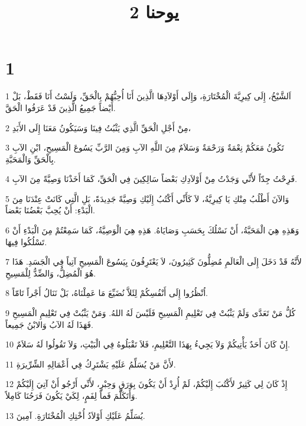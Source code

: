 

\title{2 يوحنا}


\chapter{1}

\par 1 اَلشَّيْخُ، إِلَى كِيرِيَّةَ الْمُخْتَارَةِ، وَإِلَى أَوْلاَدِهَا الَّذِينَ أَنَا أُحِبُّهُمْ بِالْحَقِّ، وَلَسْتُ أَنَا فَقَطْ، بَلْ أَيْضاً جَمِيعُ الَّذِينَ قَدْ عَرَفُوا الْحَقَّ.
\par 2 مِنْ أَجْلِ الْحَقِّ الَّذِي يَثْبُتُ فِينَا وَسَيَكُونُ مَعَنَا إِلَى الأَبَدِ،
\par 3 تَكُونُ مَعَكُمْ نِعْمَةٌ وَرَحْمَةٌ وَسَلاَمٌ مِنَ اللَّهِ الآبِ وَمِنَ الرَّبِّ يَسُوعَ الْمَسِيحِ، ابْنِ الآبِ بِالْحَقِّ وَالْمَحَبَّةِ.
\par 4 فَرِحْتُ جِدّاً لأَنِّي وَجَدْتُ مِنْ أَوْلاَدِكِ بَعْضاً سَالِكِينَ فِي الْحَقِّ، كَمَا أَخَذْنَا وَصِيَّةً مِنَ الآبِ.
\par 5 وَالآنَ أَطْلُبُ مِنْكِ يَا كِيرِيَّةُ، لاَ كَأَنِّي أَكْتُبُ إِلَيْكِ وَصِيَّةً جَدِيدَةً، بَلِ الَّتِي كَانَتْ عِنْدَنَا مِنَ الْبَدْءِ: أَنْ يُحِبَّ بَعْضُنَا بَعْضاً.
\par 6 وَهَذِهِ هِيَ الْمَحَبَّةُ، أَنْ نَسْلُكَ بِحَسَبِ وَصَايَاهُ. هَذِهِ هِيَ الْوَصِيَّةُ، كَمَا سَمِعْتُمْ مِنَ الْبَدْءِ أَنْ تَسْلُكُوا فِيهَا.
\par 7 لأَنَّهُ قَدْ دَخَلَ إِلَى الْعَالَمِ مُضِلُّونَ كَثِيرُونَ، لاَ يَعْتَرِفُونَ بِيَسُوعَ الْمَسِيحِ آتِياً فِي الْجَسَدِ. هَذَا هُوَ الْمُضِلُّ، وَالضِّدُّ لِلْمَسِيحِ.
\par 8 اُنْظُرُوا إِلَى أَنْفُسِكُمْ لِئَلاَّ نُضَيِّعَ مَا عَمِلْنَاهُ، بَلْ نَنَالُ أَجْراً تَامّاً.
\par 9 كُلُّ مَنْ تَعَدَّى وَلَمْ يَثْبُتْ فِي تَعْلِيمِ الْمَسِيحِ فَلَيْسَ لَهُ اللهُ. وَمَنْ يَثْبُتْ فِي تَعْلِيمِ الْمَسِيحِ فَهَذَا لَهُ الآبُ وَالابْنُ جَمِيعاً.
\par 10 إِنْ كَانَ أَحَدٌ يَأْتِيكُمْ وَلاَ يَجِيءُ بِهَذَا التَّعْلِيمِ، فَلاَ تَقْبَلُوهُ فِي الْبَيْتِ، وَلاَ تَقُولُوا لَهُ سَلاَمٌ.
\par 11 لأَنَّ مَنْ يُسَلِّمُ عَلَيْهِ يَشْتَرِكُ فِي أَعْمَالِهِ الشِّرِّيرَةِ.
\par 12 إِذْ كَانَ لِي كَثِيرٌ لأَكْتُبَ إِلَيْكُمْ، لَمْ أُرِدْ أَنْ يَكُونَ بِوَرَقٍ وَحِبْرٍ، لأَنِّي أَرْجُو أَنْ آتِيَ إِلَيْكُمْ وَأَتَكَلَّمَ فَماً لِفَمٍ، لِكَيْ يَكُونَ فَرَحُنَا كَامِلاً.
\par 13 يُسَلِّمُ عَلَيْكِ أَوْلاَدُ أُخْتِكِ الْمُخْتَارَةِ. آمِينَ.


